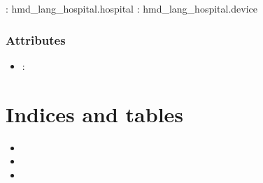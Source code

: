 \documentclass[letterpaper,10pt,english,openany,oneside]{sphinxmanual}
\begin{document}
\sphinxAtStartPar
{}: hmd\_lang\_hospital.hospital
: hmd\_lang\_hospital.device


\subsection{Attributes}
\label{\detokenize{classes/hmd_lang_hospital/hospital_owns_device:attributes}}\begin{itemize}
\item {} 
\sphinxAtStartPar
{} :

\end{itemize}


\chapter{Indices and tables}
\label{\detokenize{index:indices-and-tables}}\begin{itemize}
\item {} 
\sphinxAtStartPar
{}

\item {} 
\sphinxAtStartPar
{}

\item {} 
\sphinxAtStartPar
{}

\end{itemize}



\renewcommand{\indexname}{Index}
\printindex
\end{document}
